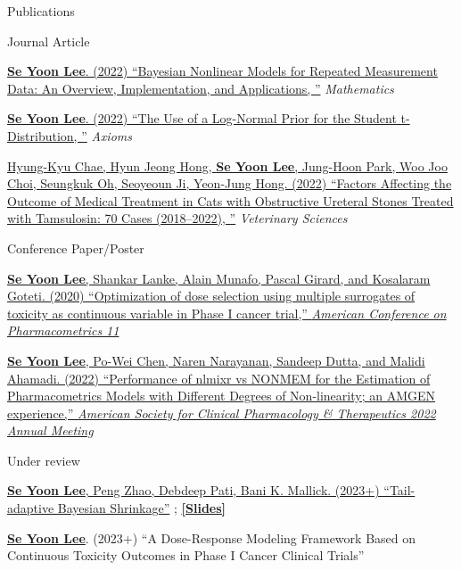 \documentclass{resume} %
\begin{document}
\begin{rSection}{Publications}
\begin{rSubsection}{Journal Article}{}{}{}
\item[] [7]
\href{https://www.mdpi.com/2227-7390/10/6/898}
{\underline{\textbf{Se Yoon Lee}}. (2022)
``Bayesian Nonlinear Models for Repeated Measurement Data: An Overview, Implementation, and Applications, ''} \textit{Mathematics} 
\item[] [8]
\href{https://www.mdpi.com/2075-1680/11/9/462}
{\underline{\textbf{Se Yoon Lee}}. (2022)
``The Use of a Log-Normal Prior for the Student t-Distribution, ''} \textit{Axioms} 
\item[] [9]
\href{https://www.mdpi.com/2306-7381/9/10/568}
{Hyung-Kyu Chae, Hyun Jeong Hong, \underline{\textbf{Se Yoon Lee}}, Jung-Hoon Park, Woo Joo Choi, Seungkuk Oh, Seoyeoun Ji, Yeon-Jung Hong. (2022)
``Factors Affecting the Outcome of Medical Treatment in Cats with Obstructive Ureteral Stones Treated with Tamsulosin: 70 Cases (2018–2022), ''} \textit{Veterinary Sciences} 
\end{rSubsection}

\begin{rSubsection}{Conference Paper/Poster}{}{}{}
\item[] [1] 
\href{https://github.com/yain22/2PLD/blob/main/Poster/ACOP_Se_Yoon_Lee_PhD.pdf}{\underline{\textbf{Se Yoon Lee}}, Shankar Lanke, Alain Munafo, Pascal Girard, and Kosalaram Goteti. (2020)
``Optimization of dose selection using multiple surrogates of toxicity as continuous variable in Phase I cancer trial,'' \textit{American Conference on Pharmacometrics 11}}
\item[] [2] 
\href{https://github.com/yain22/2PLD/blob/main/Poster/ASCPT-2022-Poster_nlmixr_Final.pdf}{\underline{\textbf{Se Yoon Lee}}, Po-Wei Chen, Naren Narayanan, Sandeep Dutta, and Malidi Ahamadi. (2022)
``Performance of nlmixr vs NONMEM for the Estimation of Pharmacometrics Models with Different Degrees of Non-linearity; an AMGEN experience,'' \textit{American Society for Clinical Pharmacology \& Therapeutics 2022 Annual Meeting}}
\end{rSubsection}



\begin{rSubsection}{Under review}{}{}{}
\item[] [1]
\href{https://arxiv.org/abs/2007.02192}
{\underline{\textbf{Se Yoon Lee}}, Peng Zhao, Debdeep Pati, Bani K. Mallick. (2023+)
``Tail-adaptive Bayesian Shrinkage''}
;
\href{https://www.dropbox.com/s/5sx21h4guwl4dyz/Main_Doctoral_Dissertation_Work.pdf?dl=0}{\underline{\textbf{[Slides]}}}
\item[] [2]
\underline{\textbf{Se Yoon Lee}}. (2023+)
``A Dose-Response Modeling Framework Based on Continuous Toxicity Outcomes in Phase I Cancer Clinical Trials''
\end{rSubsection}
\end{rSection}
\end{document}
